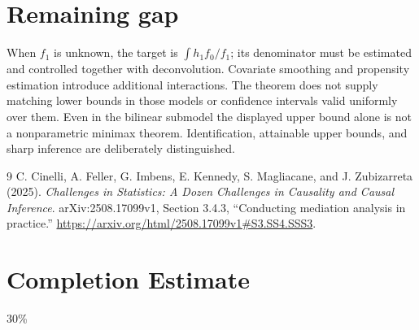 \documentclass[11pt,a4paper]{article}
\theoremstyle{definition}
\theoremstyle{remark}
\begin{document}
\section{Remaining gap}
When $f_1$ is unknown, the target is $\int h_1f_0/f_1$; its denominator must be estimated and controlled together with deconvolution. Covariate smoothing and propensity estimation introduce additional interactions. The theorem does not supply matching lower bounds in those models or confidence intervals valid uniformly over them. Even in the bilinear submodel the displayed upper bound alone is not a nonparametric minimax theorem. Identification, attainable upper bounds, and sharp inference are deliberately distinguished.
\begin{thebibliography}{9}
 C. Cinelli, A. Feller, G. Imbens, E. Kennedy, S. Magliacane, and J. Zubizarreta (2025).
\emph{Challenges in Statistics: A Dozen Challenges in Causality and Causal Inference}. arXiv:2508.17099v1, Section 3.4.3, ``Conducting mediation analysis in practice.''
\url{https://arxiv.org/html/2508.17099v1#S3.SS4.SSS3}.
\end{thebibliography}

\section{Completion Estimate}
30\%
\end{document}
